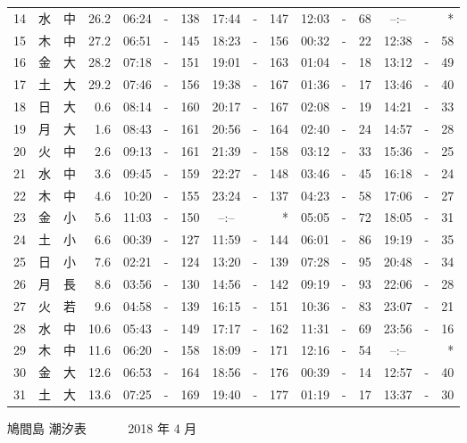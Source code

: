 \documentclass[12pt.a4j]{jsarticle}
\begin{document}
\begin{center}
\begin{table}[ht]
\begin{tabular}{|rc|cr|ccrccr|ccrccr|}
14 & 水 & 中 & 26.2 & 06:24 &-& 138 & 17:44 &-& 147 & 12:03 &-&  68 & --:-- & &  *  \\
15 & 木 & 中 & 27.2 & 06:51 &-& 145 & 18:23 &-& 156 & 00:32 &-&  22 & 12:38 &-&  58 \\
16 & 金 & 大 & 28.2 & 07:18 &-& 151 & 19:01 &-& 163 & 01:04 &-&  18 & 13:12 &-&  49 \\
17 & 土 & 大 & 29.2 & 07:46 &-& 156 & 19:38 &-& 167 & 01:36 &-&  17 & 13:46 &-&  40 \\
18 & 日 & 大 &  0.6 & 08:14 &-& 160 & 20:17 &-& 167 & 02:08 &-&  19 & 14:21 &-&  33 \\
19 & 月 & 大 &  1.6 & 08:43 &-& 161 & 20:56 &-& 164 & 02:40 &-&  24 & 14:57 &-&  28 \\
20 & 火 & 中 &  2.6 & 09:13 &-& 161 & 21:39 &-& 158 & 03:12 &-&  33 & 15:36 &-&  25 \\
21 & 水 & 中 &  3.6 & 09:45 &-& 159 & 22:27 &-& 148 & 03:46 &-&  45 & 16:18 &-&  24 \\
22 & 木 & 中 &  4.6 & 10:20 &-& 155 & 23:24 &-& 137 & 04:23 &-&  58 & 17:06 &-&  27 \\
23 & 金 & 小 &  5.6 & 11:03 &-& 150 & --:-- & &  *  & 05:05 &-&  72 & 18:05 &-&  31 \\
24 & 土 & 小 &  6.6 & 00:39 &-& 127 & 11:59 &-& 144 & 06:01 &-&  86 & 19:19 &-&  35 \\
25 & 日 & 小 &  7.6 & 02:21 &-& 124 & 13:20 &-& 139 & 07:28 &-&  95 & 20:48 &-&  34 \\
26 & 月 & 長 &  8.6 & 03:56 &-& 130 & 14:56 &-& 142 & 09:19 &-&  93 & 22:06 &-&  28 \\
27 & 火 & 若 &  9.6 & 04:58 &-& 139 & 16:15 &-& 151 & 10:36 &-&  83 & 23:07 &-&  21 \\
28 & 水 & 中 & 10.6 & 05:43 &-& 149 & 17:17 &-& 162 & 11:31 &-&  69 & 23:56 &-&  16 \\
29 & 木 & 中 & 11.6 & 06:20 &-& 158 & 18:09 &-& 171 & 12:16 &-&  54 & --:-- & &  *  \\
30 & 金 & 大 & 12.6 & 06:53 &-& 164 & 18:56 &-& 176 & 00:39 &-&  14 & 12:57 &-&  40 \\
31 & 土 & 大 & 13.6 & 07:25 &-& 169 & 19:40 &-& 177 & 01:19 &-&  17 & 13:37 &-&  30 \\
\hline
\end{tabular}
\end{table}
\newpage
{\LARGE 鳩間島  潮汐表　　　}
{\large 2018 年  4 月}\\
\begin{table}[ht]
\begin{tabular}{|rc|cr|ccrccr|ccrccr|}

\end{tabular}
\end{table}
\end{center}
\end{document}
